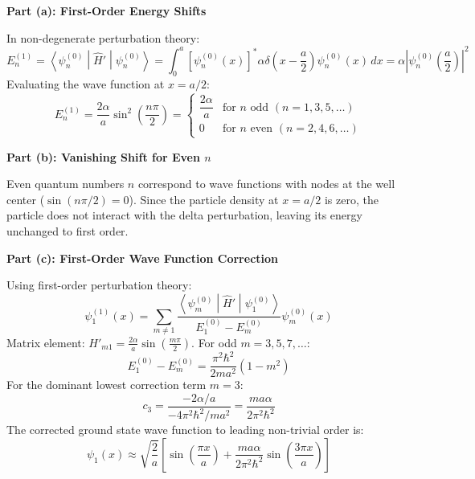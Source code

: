 \documentclass[11pt, a4paper, parskip=half]{scrartcl}
\newcommand{\mel}[3]{\left\langle #1 \middle| #2 \middle| #3 \right\rangle}
\begin{document}
\begin{solutionbox}
\textbf{Part (a): First-Order Energy Shifts}

In non-degenerate perturbation theory:
\[
E_n^{(1)} = \mel{\psi_n^{(0)}}{\hat{H}'}{\psi_n^{(0)}} = \int_0^a \left[\psi_n^{(0)}(x)\right]^* \alpha \delta\left(x - \frac{a}{2}\right) \psi_n^{(0)}(x) \, dx = \alpha \left|\psi_n^{(0)}\left(\frac{a}{2}\right)\right|^2
\]
Evaluating the wave function at $x = a/2$:
\[
E_n^{(1)} = \frac{2\alpha}{a} \sin^2\left( \frac{n\pi}{2} \right) = \begin{cases} \dfrac{2\alpha}{a} & \text{for } n \text{ odd } (n = 1, 3, 5, \dots) \\[6pt] 0 & \text{for } n \text{ even } (n = 2, 4, 6, \dots) \end{cases}
\]

\textbf{Part (b): Vanishing Shift for Even $n$}

Even quantum numbers $n$ correspond to wave functions with nodes at the well center ($\sin(n\pi/2) = 0$). Since the particle density at $x = a/2$ is zero, the particle does not interact with the delta perturbation, leaving its energy unchanged to first order.

\textbf{Part (c): First-Order Wave Function Correction}

Using first-order perturbation theory:
\[
\psi_1^{(1)}(x) = \sum_{m \neq 1} \frac{\mel{\psi_m^{(0)}}{\hat{H}'}{\psi_1^{(0)}}}{E_1^{(0)} - E_m^{(0)}} \psi_m^{(0)}(x)
\]
Matrix element: $H'_{m1} = \frac{2\alpha}{a} \sin\left(\frac{m\pi}{2}\right)$. For odd $m = 3, 5, 7, \dots$:
\[
E_1^{(0)} - E_m^{(0)} = \frac{\pi^2 \hbar^2}{2ma^2} (1 - m^2)
\]
For the dominant lowest correction term $m = 3$:
\[
c_3 = \frac{-2\alpha/a}{-4\pi^2\hbar^2 / ma^2} = \frac{m a \alpha}{2\pi^2 \hbar^2}
\]
The corrected ground state wave function to leading non-trivial order is:
\[
\psi_1(x) \approx \sqrt{\frac{2}{a}} \left[ \sin\left(\frac{\pi x}{a}\right) + \frac{m a \alpha}{2\pi^2 \hbar^2} \sin\left(\frac{3\pi x}{a}\right) \right]
\]
\end{solutionbox}

\vspace{3mm}
\end{document}
